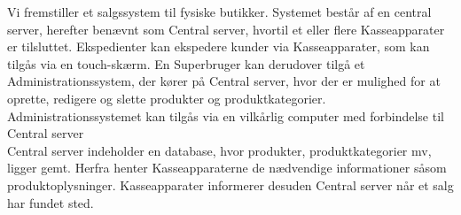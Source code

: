 Vi fremstiller et salgssystem til fysiske butikker. Systemet består af en central server, herefter benævnt som Central server, hvortil et eller flere Kasseapparater er tilsluttet. Ekspedienter kan ekspedere kunder via Kasseapparater, som kan tilgås via en touch-skærm. En Superbruger kan derudover tilgå et Administrationssystem, der kører på Central server, hvor der er mulighed for at oprette, redigere og slette produkter og produktkategorier. Administrationssystemet kan tilgås via en vilkårlig computer med forbindelse til Central server\\

Central server indeholder en database, hvor produkter, produktkategorier mv, ligger gemt. Herfra henter Kasseapparaterne de nædvendige informationer såsom produktoplysninger. Kasseapparater informerer desuden Central server når et salg har fundet sted.